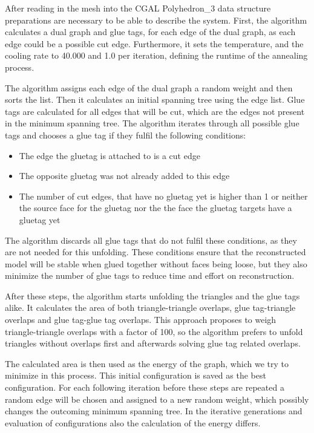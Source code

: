 \documentclass[draft,final]{vutinfth} %
\begin{document}
After reading in the mesh into the CGAL Polyhedron\_3 data structure preparations are necessary to be able to describe the system. First, the algorithm calculates a dual graph and glue tags, for each edge of the dual graph, as each edge could be a possible cut edge. Furthermore, it sets the temperature, and the cooling rate to 40.000 and 1.0 per iteration, defining the runtime of the annealing process.

The algorithm assigns each edge of the dual graph a random weight and then sorts the list. Then it calculates an initial spanning tree using the edge list. Glue tags are calculated for all edges that will be cut, which are the edges not present in the minimum spanning tree. The algorithm iterates through all possible glue tags and chooses a glue tag if they fulfil the following conditions:

\begin{itemize}
	\item The edge the gluetag is attached to is a cut edge
	\item The opposite gluetag was not already added to this edge
	\item The number of cut edges, that have no gluetag yet is higher than 1 or neither the source face for the gluetag nor the the face the gluetag targets have a gluetag yet
\end{itemize}

The algorithm discards all glue tags that do not fulfil these conditions, as they are not needed for this unfolding. These conditions ensure that the reconstructed model will be stable when glued together without faces being loose, but they also minimize the number of glue tags to reduce time and effort on reconstruction.

After these steps, the algorithm starts unfolding the triangles and the glue tags alike. It calculates the area of both triangle-triangle overlaps, glue tag-triangle overlaps and glue tag-glue tag overlaps. This approach proposes to weigh triangle-triangle overlaps with a factor of 100, so the algorithm prefers to unfold triangles without overlaps first and afterwards solving glue tag related overlaps.

The calculated area is then used as the energy of the graph, which we try to minimize in this process. This initial configuration is saved as the best configuration. For each following iteration before these steps are repeated a random edge will be chosen and assigned to a new random weight, which possibly changes the outcoming minimum spanning tree. In the iterative generations and evaluation of configurations also the calculation of the energy differs. 
\end{document}
